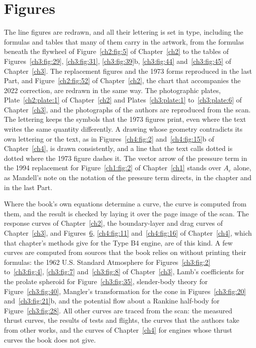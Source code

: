\section*{Figures}

The line figures are redrawn, and all their lettering is set in type, including the formulas and
tables that many of them carry in the artwork, from the formulas beneath the flywheel of
Figure~\ref{ch2:fig:5} of Chapter~\ref{ch2} to the tables of Figures~\ref{ch3:fig:29},
\ref{ch3:fig:31}, \ref{ch3:fig:39}b, \ref{ch3:fig:44} and~\ref{ch3:fig:45} of Chapter~\ref{ch3}.
The replacement figures and the 1973 forms reproduced in the last Part, and Figure~\ref{ch2:fig:52}
of Chapter~\ref{ch2}, the chart that accompanies the 2022 correction, are redrawn in the same way. The
photographic plates, Plate~\ref{ch2:plate:1} of Chapter~\ref{ch2} and Plates~\ref{ch3:plate:1}
to~\ref{ch3:plate:6} of Chapter~\ref{ch3}, and the photographs of the authors are reproduced from
the scan. The lettering keeps the symbols that the 1973 figures print, even where the text writes
the same quantity differently. A drawing whose geometry contradicts its own lettering or the text,
as in Figures~\ref{ch4:fig:2} and~\ref{ch4:fig:15}b of Chapter~\ref{ch4}, is drawn consistently,
and a line that the text calls dotted is dotted where the 1973 figure dashes it. The vector arrow of the
pressure term in the 1994 replacement for Figure~\ref{ch1:fig:2} of Chapter~\ref{ch1} stands over
$A_e$ alone, as Mandell's note on the notation of the pressure term directs, in the chapter and in
the last Part.

Where the book's own equations determine a curve, the curve is computed from them, and the result is
checked by laying it over the page image of the scan. The response curves of
Chapter~\ref{ch2}, the boundary-layer and drag curves of Chapter~\ref{ch3}, and
Figures~\hyperref[ch4:fig:6a]{6}, \ref{ch4:fig:11} and~\ref{ch4:fig:16} of Chapter~\ref{ch4}, which that
chapter's methods give for the Type B4 engine, are of this kind. A few curves are computed from
sources that the book relies on without printing their formulas: the 1962 U.S. Standard Atmosphere
for Figures~\ref{ch3:fig:2} to~\ref{ch3:fig:4}, \ref{ch3:fig:7} and~\ref{ch3:fig:8} of
Chapter~\ref{ch3}, Lamb's coefficients for the prolate spheroid for Figure~\ref{ch3:fig:35},
slender-body theory for Figure~\ref{ch3:fig:40}, Mangler's transformation for the cone in
Figures~\ref{ch3:fig:20} and~\ref{ch3:fig:21}b, and the potential flow about a Rankine half-body for
Figure~\ref{ch3:fig:28}. All other curves are traced from the scan: the measured thrust curves, the
results of tests and flights, the curves that the authors take from other works, and the curves of
Chapter~\ref{ch4} for engines whose thrust curves the book does not give.

